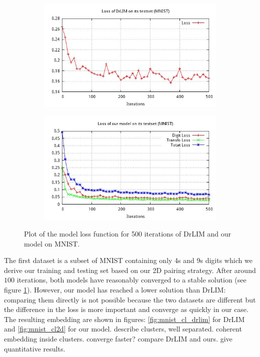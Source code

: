 \documentclass[a4paper,12pt]{report}
\begin{document}
\begin{figure}[t]
    \centering
    \begin{subfigure}[t]{0.45\textwidth}
        \centering
        \includegraphics[width=\textwidth]{thesis_figures/final_loss_testset_2bv7.jpg}
    \end{subfigure}
    \begin{subfigure}[t]{0.45\textwidth}
        \centering
        \includegraphics[width=\textwidth]{thesis_figures/final_loss_testset_3Dc3.jpg}
    \end{subfigure}
    \caption{Plot of the model loss function for 500 iterations of DrLIM and our model on MNIST.}
    \label{fig:mnist_cl2d_loss}
\end{figure}

The first dataset is a subset of MNIST containing only 4s and 9s digits which we derive our training and testing set based on our 2D pairing strategy.
After around $100$ iterations, both models have reasonably converged to a stable solution (see figure \ref{fig:mnist_cl2d_loss}).
However, our model has reached a lower solution than DrLIM: comparing them directly is not possible because the two datasets are different but the difference in the loss is more important and converge as quickly in our case.
The resulting embedding are shown in figures: \ref{fig:mnist_cl_drlim} for DrLIM and \ref{fig:mnist_cl2d} for our model.
describe clusters, well separated.
coherent embedding inside clusters.
converge faster?
compare DrLIM and ours.
give quantitative results.
\end{document}
